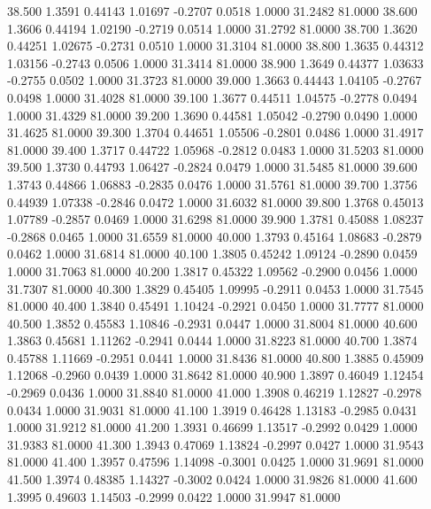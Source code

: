   38.500   1.3591   0.44143   1.01697  -0.2707   0.0518   1.0000  31.2482  81.0000
  38.600   1.3606   0.44194   1.02190  -0.2719   0.0514   1.0000  31.2792  81.0000
  38.700   1.3620   0.44251   1.02675  -0.2731   0.0510   1.0000  31.3104  81.0000
  38.800   1.3635   0.44312   1.03156  -0.2743   0.0506   1.0000  31.3414  81.0000
  38.900   1.3649   0.44377   1.03633  -0.2755   0.0502   1.0000  31.3723  81.0000
  39.000   1.3663   0.44443   1.04105  -0.2767   0.0498   1.0000  31.4028  81.0000
  39.100   1.3677   0.44511   1.04575  -0.2778   0.0494   1.0000  31.4329  81.0000
  39.200   1.3690   0.44581   1.05042  -0.2790   0.0490   1.0000  31.4625  81.0000
  39.300   1.3704   0.44651   1.05506  -0.2801   0.0486   1.0000  31.4917  81.0000
  39.400   1.3717   0.44722   1.05968  -0.2812   0.0483   1.0000  31.5203  81.0000
  39.500   1.3730   0.44793   1.06427  -0.2824   0.0479   1.0000  31.5485  81.0000
  39.600   1.3743   0.44866   1.06883  -0.2835   0.0476   1.0000  31.5761  81.0000
  39.700   1.3756   0.44939   1.07338  -0.2846   0.0472   1.0000  31.6032  81.0000
  39.800   1.3768   0.45013   1.07789  -0.2857   0.0469   1.0000  31.6298  81.0000
  39.900   1.3781   0.45088   1.08237  -0.2868   0.0465   1.0000  31.6559  81.0000
  40.000   1.3793   0.45164   1.08683  -0.2879   0.0462   1.0000  31.6814  81.0000
  40.100   1.3805   0.45242   1.09124  -0.2890   0.0459   1.0000  31.7063  81.0000
  40.200   1.3817   0.45322   1.09562  -0.2900   0.0456   1.0000  31.7307  81.0000
  40.300   1.3829   0.45405   1.09995  -0.2911   0.0453   1.0000  31.7545  81.0000
  40.400   1.3840   0.45491   1.10424  -0.2921   0.0450   1.0000  31.7777  81.0000
  40.500   1.3852   0.45583   1.10846  -0.2931   0.0447   1.0000  31.8004  81.0000
  40.600   1.3863   0.45681   1.11262  -0.2941   0.0444   1.0000  31.8223  81.0000
  40.700   1.3874   0.45788   1.11669  -0.2951   0.0441   1.0000  31.8436  81.0000
  40.800   1.3885   0.45909   1.12068  -0.2960   0.0439   1.0000  31.8642  81.0000
  40.900   1.3897   0.46049   1.12454  -0.2969   0.0436   1.0000  31.8840  81.0000
  41.000   1.3908   0.46219   1.12827  -0.2978   0.0434   1.0000  31.9031  81.0000
  41.100   1.3919   0.46428   1.13183  -0.2985   0.0431   1.0000  31.9212  81.0000
  41.200   1.3931   0.46699   1.13517  -0.2992   0.0429   1.0000  31.9383  81.0000
  41.300   1.3943   0.47069   1.13824  -0.2997   0.0427   1.0000  31.9543  81.0000
  41.400   1.3957   0.47596   1.14098  -0.3001   0.0425   1.0000  31.9691  81.0000
  41.500   1.3974   0.48385   1.14327  -0.3002   0.0424   1.0000  31.9826  81.0000
  41.600   1.3995   0.49603   1.14503  -0.2999   0.0422   1.0000  31.9947  81.0000
